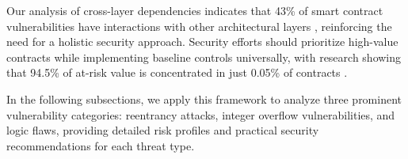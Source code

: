 Our analysis of cross-layer dependencies indicates that 43\% of smart contract vulnerabilities have interactions with other architectural layers \cite{praitheeshan2019systematic}, reinforcing the need for a holistic security approach. Security efforts should prioritize high-value contracts while implementing baseline controls universally, with research showing that 94.5\% of at-risk value is concentrated in just 0.05\% of contracts \cite{perez2021analysis}.

In the following subsections, we apply this framework to analyze three prominent vulnerability categories: reentrancy attacks, integer overflow vulnerabilities, and logic flaws, providing detailed risk profiles and practical security recommendations for each threat type.


